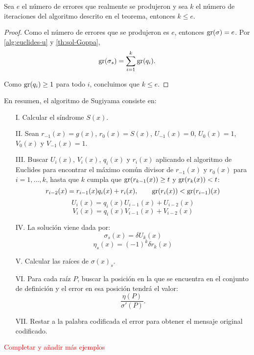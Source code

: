 \begin{corollary}
    Sea $e$ el número de errores que realmente se produjeron y sea $k$ el número de iteraciones del algoritmo descrito en el teorema, entonces $k \leq e$.
\end{corollary}

\begin{proof}
    Como el número de errores que se produjeron es $e$, entonces $\operatorname{gr}(\sigma) = e$. Por \eqref{alg:euclides-u} y \eqref{th:sol-Goppa},
    $$\operatorname{gr}(\sigma_s) = \sum_{i=1}^k \operatorname{gr}(q_i).$$

    Como $\operatorname{gr}(q_i) \geq 1$ para todo $i$, concluimos que $k \leq e$.
\end{proof}

En resumen, el algoritmo de Sugiyama consiste en:

\begin{itemize}
    \item[I.] Calcular el síndrome $S(x)$.
    \item[II.] Sean $r_{-1}(x) = g(x)$, $r_0(x) = S(x)$, $U_{-1}(x) = 0$, $U_0(x) = 1$, $V_0(x)$ y $V_{-1}(x) = 1$.
    \item[III.] Buscar $U_i(x)$, $V_i(x)$, $q_i(x)$ y $r_i(x)$ aplicando el algoritmo de Euclides para encontrar el máximo común divisor de $r_{-1}(x)$ y $r_0(x)$ para $i = 1,..., k$, hasta que $k$ cumpla que $\operatorname{gr}(r_{k-1}(x)) \geq t$ y $\operatorname{gr}(r_k(x)) < t$:
        $$r_{i-2}(x) = r_{i-1}(x) q_i(x) + r_i(x), \qquad \operatorname{gr}(r_i(x)) < \operatorname{gr}(r_{i-1})(x)$$
        $$U_i(x) = q_i(x) U_{i-1}(x) + U_{i-2}(x)$$
        $$V_i(x) = q_i(x) V_{i-1}(x) + V_{i-2}(x)$$  
    \item[IV.] La solución viene dada por:
        $$\sigma_s(x) = \delta U_k(x)$$ 
        $$\eta_s(x) = (-1)^k \delta r_k(x)$$   
    \item[V.] Calcular las raíces de $\sigma(x)_s$.
    \item[VI.] Para cada raíz $P$, buscar la posición en la que se encuentra en el conjunto de definición y el error en esa posición tendrá el valor:
        $$\frac{\eta(P)}{\sigma'(P)}.$$
    \item[VII.] Restar a la palabra codificada el error para obtener el mensaje original codificado.
\end{itemize}

\begin{exampleth}
\end{exampleth}

\textcolor{red}{Completar y añadir más ejemplos}


